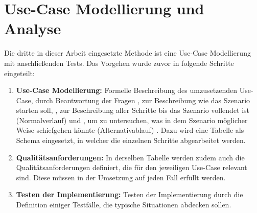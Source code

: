 \section{Use-Case Modellierung und Analyse}

Die dritte in dieser Arbeit eingesetzte Methode ist eine Use-Case Modellierung mit anschließenden Tests. Das Vorgehen wurde zuvor in folgende Schritte eingeteilt:
\begin{enumerate}
    \item \textbf{Use-Case Modellierung:} Formelle Beschreibung des umzusetzenden Use-Case, durch Beantwortung der Fragen \grqq{}, zur Beschreibung wie das Szenario starten soll, \grqq{}, zur Beschreibung aller Schritte bis das Szenario vollendet ist (Normalverlauf) und \grqq{}, um zu untersuchen, was in dem Szenario möglicher Weise schiefgehen könnte (Alternativablauf) \cite[Vgl.][S. 52]{Rosenberg2007}. Dazu wird eine Tabelle als Schema eingesetzt, in welcher die einzelnen Schritte abgearbeitet werden.
    \item \textbf{Qualitätsanforderungen:} In derselben Tabelle werden zudem auch die Qualitätsanforderungen definiert, die für den jeweiligen Use-Case relevant sind. Diese müssen in der Umsetzung auf jeden Fall erfüllt werden.
    \item \textbf{Testen der Implementierung:} Testen der Implementierung durch die Definition einiger Testfälle, die typische Situationen abdecken sollen.
\end{enumerate}